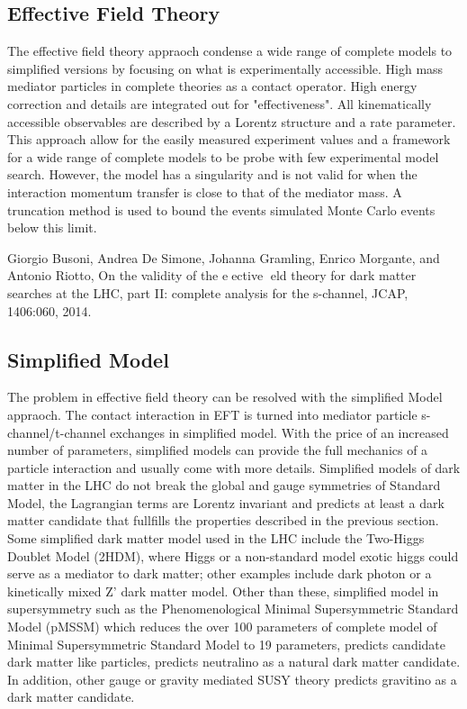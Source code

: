 \subsection{Effective Field Theory}
The effective field theory appraoch condense a wide range of complete models to simplified versions by focusing on what is experimentally accessible. High mass mediator particles in complete theories as a contact operator. High energy correction and details are integrated out for "effectiveness". All kinematically accessible observables are described by a Lorentz structure and a rate parameter. 
This approach allow for the easily measured experiment values and a framework for a wide range of complete models to be probe with few experimental model search. However, the model has a singularity and is not valid for when the interaction momentum transfer is close to that of the mediator mass. A truncation method is used to bound the events simulated Monte Carlo events below this limit.  

Giorgio Busoni, Andrea De Simone, Johanna Gramling, Enrico Morgante, and Antonio Riotto, On the validity of the e􏶺ective 􏶻eld theory for dark matter searches at the LHC, part II: complete analysis for the s-channel, JCAP, 1406:060, 2014.

\subsection{Simplified Model}
The problem in effective field theory can be resolved with the simplified Model appraoch. The contact interaction in EFT is turned into mediator particle s-channel/t-channel exchanges in simplified model. With the price of an increased number of parameters, simplified models can provide the full mechanics of a particle interaction and usually come with more details. 
Simplified models of dark matter in the LHC do not break the global and gauge symmetries of Standard Model, the Lagrangian terms are Lorentz invariant and predicts at least a dark matter candidate that fullfills the properties described in the previous section. 
Some simplified dark matter model used in the LHC include the Two-Higgs Doublet Model (2HDM), where Higgs or a non-standard model exotic higgs could serve as a mediator to dark matter; other examples include dark photon or a kinetically mixed Z' dark matter model. 
Other than these, simplified model in supersymmetry such as the Phenomenological Minimal Supersymmetric Standard Model (pMSSM) which reduces the over 100 parameters of complete model of Minimal Supersymmetric Standard Model to 19 parameters, predicts candidate dark matter like particles, predicts neutralino as a natural dark matter candidate. 
In addition, other gauge or gravity mediated SUSY theory predicts gravitino as a dark matter candidate. 

